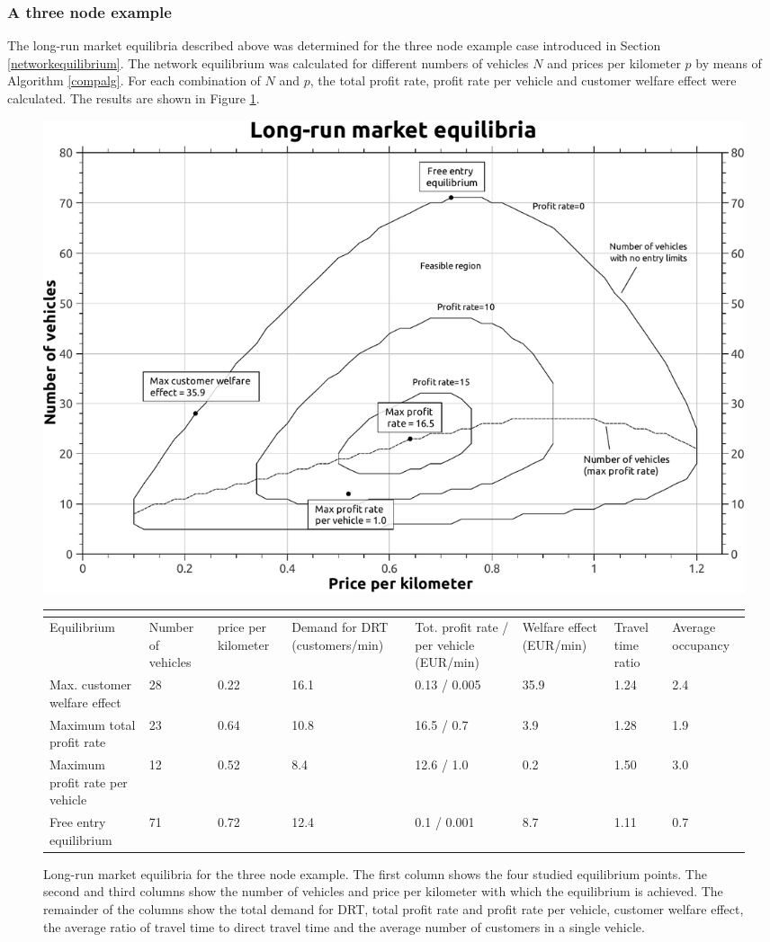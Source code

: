 \documentclass[dissertation,draft*]{aaltoseries}
\begin{document}
\subsubsection{A three node example}
The long-run market equilibria described above was determined for the three node example case introduced
in Section \ref{networkequilibrium}. The network equilibrium was calculated for different numbers
of vehicles $N$ and prices per kilometer $p$ by means of Algorithm \ref{compalg}.
For each combination of $N$ and $p$, the total profit rate, profit 
rate per vehicle and customer welfare effect were calculated. The results are shown in Figure \ref{a-equilibria01}.

\begin{figure}[ht]
\begin{center}
\includegraphics[width=0.9\columnwidth]{a-equilibria01}
\\
{\scriptsize
\begin{tabular}{|p{2.0cm}|p{1.0cm}|p{1.0cm}|p{1.5cm}|p{1.4cm}|p{1.2cm}|p{0.75cm}|p{0.9cm}|}
\multicolumn{8}{c}{} \\
\hline
Equilibrium & Number of vehicles & price per kilometer & Demand for DRT (customers/min) & 
Tot. profit rate / per vehicle (EUR/min) & Welfare effect (EUR/min) & Travel time ratio & Average occupancy \\
\hline
Max. customer welfare effect & 28 & 0.22 & 16.1 & 0.13 / 0.005 & 35.9 & 1.24 & 2.4 \\
\hline
Maximum total profit rate & 23 & 0.64 & 10.8 & 16.5 / 0.7 & 3.9 & 1.28 & 1.9 \\
\hline
Maximum profit rate per vehicle & 12 & 0.52 & 8.4 & 12.6 / 1.0 & 0.2 & 1.50 & 3.0 \\
\hline
Free entry equilibrium & 71 & 0.72 & 12.4 & 0.1 / 0.001 & 8.7 & 1.11 & 0.7 \\
\hline
\end{tabular}
}
\caption{Long-run market equilibria for the three node example. The first column shows the
four studied equilibrium points. The second and third columns show the 
number of vehicles and price per kilometer with which the equilibrium is achieved.
The remainder of the columns show the total demand for DRT, total profit rate and profit rate
per vehicle, customer welfare effect, the average ratio of travel time to direct travel time
and the average number of customers in a single vehicle.}
\label{a-equilibria01}
\end{center}
\end{figure}
\end{document}
